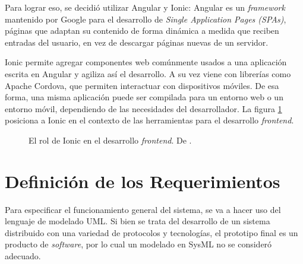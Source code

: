 \begin{enumerate}
    Para lograr eso, se decidió utilizar Angular y Ionic: Angular es un \textit{framework} mantenido por Google para el desarrollo de \textit{Single Application Pages (SPAs)}, páginas que adaptan su contenido de forma dinámica a medida que reciben entradas del usuario, en vez de descargar páginas nuevas de un servidor. 
    
    Ionic permite agregar componentes web comúnmente usados a una aplicación escrita en Angular y agiliza así el desarrollo. A su vez viene con librerías como Apache Cordova, que permiten interactuar con dispositivos móviles. De esa forma, una misma aplicación puede ser compilada para un entorno web o un entorno móvil, dependiendo de las necesidades del desarrollador. La figura \ref{fig:ionic_stack} posiciona a Ionic en el contexto de las herramientas para el desarrollo \textit{frontend}.

    \begin{figure}[H]
        \caption{El rol de Ionic en el desarrollo \textit{frontend}. De \cite{what-is-ionic}.}
        \label{fig:ionic_stack}
    \end{figure}

\end{enumerate}

\section{Definición de los Requerimientos}
Para especificar el funcionamiento general del sistema, se va a hacer uso del lenguaje de modelado UML. Si bien se trata del desarrollo de un sistema distribuido con una variedad de protocolos y tecnologías, el prototipo final es un producto de \textit{software}, por lo cual un modelado en SysML no se consideró adecuado.

